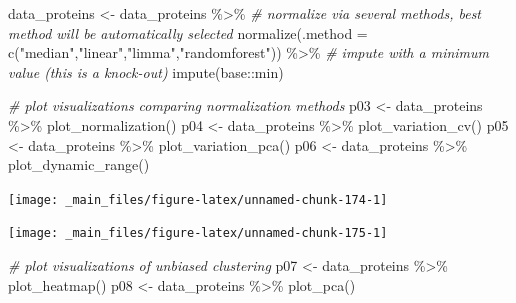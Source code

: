 \documentclass[
]{book}
\newenvironment{Shaded}{\begin{snugshade}}{\end{snugshade}}
\newcommand{\AttributeTok}[1]{\textcolor[rgb]{0.77,0.63,0.00}{#1}}
\newcommand{\CommentTok}[1]{\textcolor[rgb]{0.56,0.35,0.01}{\textit{#1}}}
\newcommand{\FunctionTok}[1]{\textcolor[rgb]{0.00,0.00,0.00}{#1}}
\newcommand{\NormalTok}[1]{#1}
\newcommand{\OtherTok}[1]{\textcolor[rgb]{0.56,0.35,0.01}{#1}}
\newcommand{\SpecialCharTok}[1]{\textcolor[rgb]{0.00,0.00,0.00}{#1}}
\newcommand{\StringTok}[1]{\textcolor[rgb]{0.31,0.60,0.02}{#1}}
\begin{document}
\begin{Shaded}
\begin{Highlighting}[]
\NormalTok{data\_proteins }\OtherTok{\textless{}{-}}\NormalTok{ data\_proteins }\SpecialCharTok{\%\textgreater{}\%}
  \CommentTok{\# normalize via several methods, best method will be automatically selected}
  \FunctionTok{normalize}\NormalTok{(}\AttributeTok{.method =} \FunctionTok{c}\NormalTok{(}\StringTok{"median"}\NormalTok{,}\StringTok{"linear"}\NormalTok{,}\StringTok{"limma"}\NormalTok{,}\StringTok{"randomforest"}\NormalTok{)) }\SpecialCharTok{\%\textgreater{}\%}
  \CommentTok{\# impute with a minimum value (this is a knock{-}out)}
  \FunctionTok{impute}\NormalTok{(base}\SpecialCharTok{::}\NormalTok{min)}

\CommentTok{\# plot visualizations comparing normalization methods}
\NormalTok{p03 }\OtherTok{\textless{}{-}}\NormalTok{ data\_proteins }\SpecialCharTok{\%\textgreater{}\%} \FunctionTok{plot\_normalization}\NormalTok{()}
\NormalTok{p04 }\OtherTok{\textless{}{-}}\NormalTok{ data\_proteins }\SpecialCharTok{\%\textgreater{}\%} \FunctionTok{plot\_variation\_cv}\NormalTok{()}
\NormalTok{p05 }\OtherTok{\textless{}{-}}\NormalTok{ data\_proteins }\SpecialCharTok{\%\textgreater{}\%} \FunctionTok{plot\_variation\_pca}\NormalTok{()}
\NormalTok{p06 }\OtherTok{\textless{}{-}}\NormalTok{ data\_proteins }\SpecialCharTok{\%\textgreater{}\%} \FunctionTok{plot\_dynamic\_range}\NormalTok{()}
\end{Highlighting}
\end{Shaded}

\begin{center}\texttt{[image: \_main\_files/figure-latex/unnamed-chunk-174-1]} \end{center}

\begin{center}\texttt{[image: \_main\_files/figure-latex/unnamed-chunk-175-1]} \end{center}

\begin{Shaded}
\begin{Highlighting}[]
\CommentTok{\# plot visualizations of unbiased clustering}
\NormalTok{p07 }\OtherTok{\textless{}{-}}\NormalTok{ data\_proteins }\SpecialCharTok{\%\textgreater{}\%} \FunctionTok{plot\_heatmap}\NormalTok{()}
\NormalTok{p08 }\OtherTok{\textless{}{-}}\NormalTok{ data\_proteins }\SpecialCharTok{\%\textgreater{}\%} \FunctionTok{plot\_pca}\NormalTok{()}
\end{Highlighting}
\end{Shaded}
\end{document}
